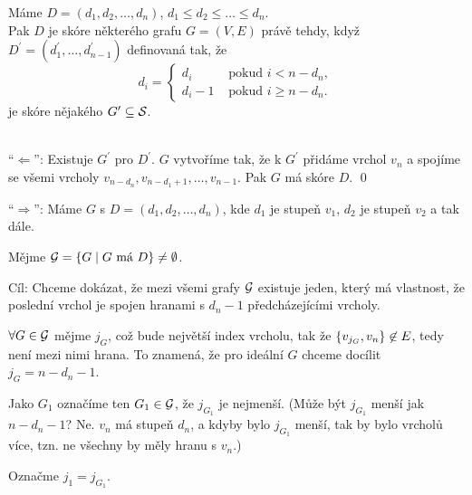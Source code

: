  Máme $D = (d_1, d_2, \dots, d_n)$, $d_1 \leq d_2 \leq \dots \leq d_n$. \\
Pak $D$ je skóre některého grafu $G = (V,E)$ právě tehdy, když $D^\prime = (d_1^\prime, \dots, d_{n-1}^\prime)$ 
definovaná tak, že
\[
    d_i = 
    \begin{cases}
        d_i &\text{ pokud } i < n-d_n, \\
        d_i-1  &\text{ pokud } i \geq n-d_n.
    \end{cases}
\]
je skóre nějakého $G^\prime \subseteq \S$.

\\
\enquote{$\Leftarrow$}: Existuje $G^\prime$ pro $D^\prime$. $G$ vytvoříme tak, že k $G^\prime$ přidáme vrchol $v_n$ a 
spojíme se všemi vrcholy $v_{n-d_n}, v_{n-d_1+1}, \dots, v_{n-1}$. Pak $G$ má skóre $D$. \qed
\vspace{1em}

\enquote{$\Rightarrow$}: Máme $G$ s $D = (d_1, d_2, \dots, d_n)$, kde $d_1$ je stupeň $v_1$, $d_2$ je stupeň $v_2$ a tak 
dále.

Mějme $\G = \bc{G \mid G \text{ má } D} \not= \emptyset$.

Cíl: Chceme dokázat, že mezi všemi grafy $\G$ existuje jeden, který má vlastnost, že poslední vrchol je spojen hranami s 
$d_n-1$ předcházejícími vrcholy.

$\forall G \in \G$ mějme $j_G$, což bude největší index vrcholu, tak že $\bc{v_{j_G}, v_n} \not\in E$, tedy není mezi 
nimi hrana. To znamená, že pro ideální $G$ chceme docílit $j_G = n-d_n-1$.

Jako $G_1$ označíme ten $G_1 \in \G$, že $j_{G_1}$ je nejmenší. (Může být $j_{G_1}$ menší jak $n-d_n-1$? Ne. $v_n$ má 
stupeň $d_n$, a kdyby bylo $j_{G_1}$ menší, tak by bylo vrcholů více, tzn. ne všechny by měly hranu s $v_n$.)

Označme $j_1 = j_{G_1}$.

